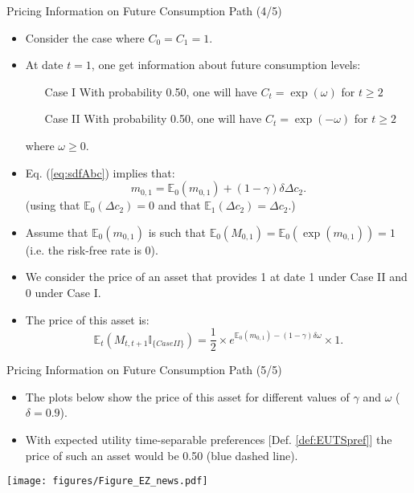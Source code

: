 \begin{frame}{Pricing Information on Future Consumption Path (4/5)}
\begin{footnotesize}
\begin{itemize}
	\item Consider the case where $C_0 = C_1 = 1$.
	\item At date $t=1$, one get information about future consumption levels:
	\begin{itemize}
		\item[Case I] With probability 0.50, one will have $C_t=\exp(\omega)$ for $t\ge2$
		\item[Case II] With probability 0.50, one will have $C_t=\exp(-\omega)$ for $t\ge2$
	\end{itemize}
	where $\omega \ge 0$.
	\item Eq. (\ref{eq:sdfAbc}) implies that:
	$$
	m_{0,1} = \mathbb{E}_0(m_{0,1}) + (1 - \gamma)\delta \Delta c_{2}.
	$$
	(using that $\mathbb{E}_0(\Delta c_{2})=0$ and that $\mathbb{E}_1(\Delta c_{2})=\Delta c_{2}$.)
	\item Assume that $\mathbb{E}_0(m_{0,1})$ is such that $\mathbb{E}_0(M_{0,1})=\mathbb{E}_0(\exp(m_{0,1}))=1$ (i.e. the risk-free rate is 0).
	\item We consider the price of an asset that provides 1 at date 1 under Case II and 0 under Case I.
	\item The price of this asset is:
	$$
	\mathbb{E}_t(M_{t,t+1}\mathbb{I}_{\{Case II\}}) = \frac{1}{2} \times e^{\mathbb{E}_0(m_{0,1}) - (1 - \gamma)\delta \omega} \times 1.
	$$
\end{itemize}
\end{footnotesize}
\end{frame}

\begin{frame}{Pricing Information on Future Consumption Path (5/5)}
\begin{scriptsize}
\begin{itemize}
	\item The plots below show the price of this asset for different values of $\gamma$ and $\omega$ ($\delta=0.9$).
	\item With expected utility time-separable preferences [Def. \ref{def:EUTSpref}] the price of such an asset would be 0.50 (blue dashed line). 
\end{itemize}
\end{scriptsize}

		\texttt{[image: figures/Figure\_EZ\_news.pdf]}
\end{frame}

